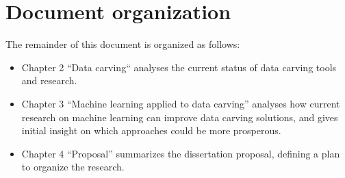 \section{Document organization}
The remainder of this document is organized as follows:

\begin{itemize}

    \item Chapter 2 ``Data carving`` analyses the current status of data carving tools and research.

    \item Chapter 3 ``Machine learning applied to data carving'' analyses how current research on machine learning can improve data carving solutions, and gives initial insight on which approaches could be more prosperous.

    \item Chapter 4 ``Proposal'' summarizes the dissertation proposal, defining a plan to organize the research.
\end{itemize}

